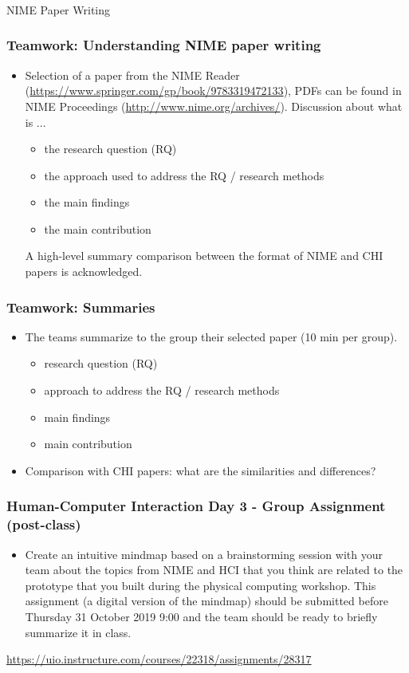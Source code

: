 \documentclass[screen, aspectratio=169]{beamer}
\begin{document}
%
\begin{frame}
\frametitle{}
\Huge{NIME Paper Writing}
\end{frame}
%
\begin{frame}
\frametitle{Teamwork: Understanding NIME paper writing}
\begin{itemize}
\item Selection of a paper from the NIME Reader (\url{https://www.springer.com/gp/book/9783319472133}), PDFs can be found in NIME Proceedings (\url{http://www.nime.org/archives/}).
Discussion about what is ... 
\begin{itemize}
\item the research question (RQ)
\item the approach used to address the RQ / research methods
\item the main findings 
\item the main contribution
\end{itemize}
A high-level summary comparison between the format of NIME and CHI papers is acknowledged.
\end{itemize}
\end{frame}
%
\begin{frame}
\frametitle{Teamwork: Summaries}
\begin{itemize}
\item The teams summarize to the group their selected paper (10 min per group). 
\begin{itemize}
\item research question (RQ)
\item approach to address the RQ / research methods
\item main findings 
\item main contribution
\end{itemize}
\item Comparison with CHI papers: what are the similarities and differences? 
\end{itemize}
\end{frame}
%
\begin{frame}
\frametitle{Human-Computer Interaction Day 3 - Group Assignment (post-class)}
\begin{itemize}
\item Create an intuitive mindmap based on a brainstorming session with your team about the topics from NIME and HCI that you think are related to the prototype that you built during the physical computing workshop. This assignment (a digital version of the mindmap) should be submitted before Thursday 31 October 2019 9:00 and the team should be ready to briefly summarize it in class.
\end{itemize}
\url{https://uio.instructure.com/courses/22318/assignments/28317}
\end{frame}
\end{document}
